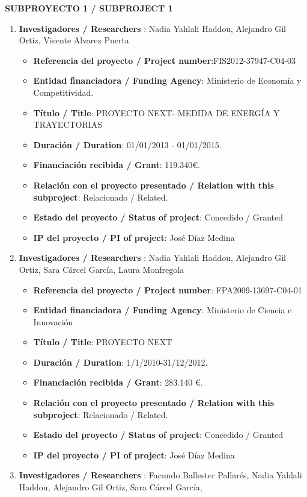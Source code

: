 \noindent\textbf{SUBPROYECTO 1 / SUBPROJECT 1}

\begin{enumerate}
\item {\bf Investigadores / Researchers }: Nadia Yahlali Haddou, Alejandro Gil Ortiz, Vicente Alvarez Puerta
\begin{itemize}
\item {\bf Referencia del proyecto / Project number}:FIS2012-37947-C04-03
\item {\bf Entidad financiadora / Funding Agency}: Ministerio de Economía y Competitividad.
\item {\bf Título / Title}:  PROYECTO NEXT- MEDIDA DE ENERGÍA Y TRAYECTORIAS
\item {\bf Duración / Duration}: 01/01/2013 - 01/01/2015. 
\item {\bf Financiación recibida / Grant}: 119.340\euro. 
\item {\bf Relación con el proyecto presentado / Relation with this subproject}: Relacionado / Related. 
\item {\bf Estado del proyecto / Status of project}: Concedido / Granted
\item {\bf IP del proyecto / PI of project}: José Díaz Medina
\end{itemize}
\item {\bf Investigadores / Researchers }: Nadia Yahlali Haddou, Alejandro Gil Ortiz, Sara Cárcel García, Laura Monfregola
\begin{itemize}
\item {\bf Referencia del proyecto / Project number}: FPA2009-13697-C04-01
\item {\bf Entidad financiadora / Funding Agency}: Ministerio de Ciencia e Innovación
\item {\bf Título / Title}:  PROYECTO NEXT
\item {\bf Duración / Duration}: 1/1/2010-31/12/2012. 
\item {\bf Financiación recibida / Grant}: 283.140 \euro. 
\item {\bf Relación con el proyecto presentado / Relation with this subproject}: Relacionado / Related. 
\item {\bf Estado del proyecto / Status of project}: Concedido / Granted
\item {\bf IP del proyecto / PI of project}: José Díaz Medina
\end{itemize}
\item {\bf Investigadores / Researchers }: Facundo Ballester Pallarés, Nadia Yahlali Haddou, Alejandro Gil Ortiz, Sara Cárcel García, 

\end{enumerate}
